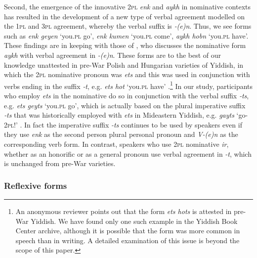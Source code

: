 \documentclass[output=paper, hidelinks]{langscibook}
\begin{document}
Second, the emergence of the innovative 2\textsc{pl} \textit{enk} and \textit{aykh} in nominative contexts has resulted in the development of a new type of verbal agreement modelled on the 1\textsc{pl} and 3\textsc{pl} agreement, whereby the verbal suffix is \textit{‑(e)n}. Thus, we see forms such as \textit{enk geyen} ‘you.\textsc{pl} go’, \textit{enk kumen} ‘you.\textsc{pl} come’, \textit{aykh hobn} ‘you.\textsc{pl} have’. These findings are in keeping with those of \citet[86]{Assouline07}, who discusses the nominative form \textit{aykh} with verbal agreement in \textit{-(e)n}. These forms are to the best of our knowledge unattested in pre-War Polish and Hungarian varieties of Yiddish, in which the 2\textsc{pl} nominative pronoun was \textit{ets} and this was used in conjunction with verbs ending in the suffix \textit{‑t}, e.g. \textit{ets hot} ‘you.\textsc{pl} have’ \citep[190]{Jacobs05}.\footnote{An anonymous reviewer points out that the form \textit{ets hots} is attested in pre-War Yiddish. We have found only one such example \citep[277]{Okrutny53} in the Yiddish Book Center archive, although it is possible that the form was more common in speech than in writing. A detailed examination of this issue is beyond the scope of this paper.} In our study, participants who employ \textit{ets} in the nominative do so in conjunction with the verbal suffix \textit{‑ts}, e.g. \textit{ets geyts} ‘you.\textsc{pl} go’, which is actually based on the plural imperative suffix \textit{‑ts} that was historically employed with \textit{ets} in Mideastern Yiddish, e.g. \textit{gayts} ‘go-2\textsc{pl}!’ \citep[70]{Jacobs05}. In fact the imperative suffix \textit{-ts} continues to be used by speakers even if they use \textit{enk} as the second person plural personal pronoun and \textit{V-(e)n} as the corresponding verb form. In contrast, speakers who use 2\textsc{pl} nominative \textit{ir}, whether as an honorific or as a general pronoun use verbal agreement in \textit{-t}, which is unchanged from pre-War varieties. 

\subsubsection{Reflexive forms}
\end{document}
